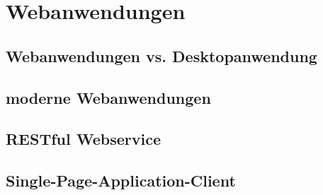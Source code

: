 \section{Webanwendungen}


\subsection{Webanwendungen vs. Desktopanwendung}


\subsection{moderne Webanwendungen}


\subsection{RESTful Webservice}


\subsection{Single-Page-Application-Client}


